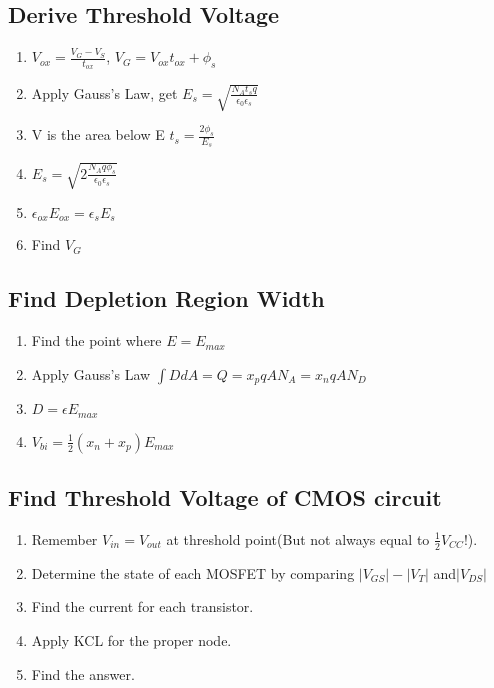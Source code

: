 \documentclass{article}
\begin{document}
   \subsection{Derive Threshold Voltage}
   \begin{enumerate}
     \item $V_{ox} = \frac{V_G - V_{S}}{t_{ox}}$, $V_G = V_{ox}t_{ox} + \phi_s$
     \item Apply Gauss's Law, get $E_s =\sqrt{ \frac{N_At_sq}{\epsilon_0\epsilon_s}}$ 
     \item V is the area below E $t_s = \frac{2\phi_s}{E_s}$
     \item $E_s =\sqrt{ 2\frac{N_Aq\phi_s}{\epsilon_0\epsilon_s}}$ 
     \item $\epsilon_{ox}E_{ox} = \epsilon_{s}E_s$
     \item Find $V_G$
   \end{enumerate}
   
   \subsection{Find Depletion Region Width}
   \begin{enumerate}
     \item Find the point where $E = E_{max}$
     \item Apply Gauss's Law $\int DdA = Q = x_pqAN_A = x_nqAN_D$
     \item $D = \epsilon E_{max}$
     \item $V_{bi} = \frac{1}{2}(x_n + x_p)E_{max}$
   \end{enumerate}

   \subsection{Find Threshold Voltage of CMOS circuit}
   \begin{enumerate}
    \item Remember $V_{in} = V_{out}$ at threshold point(But not always equal to $\frac{1}{2}V_{CC}$!).
    \item Determine the state of each MOSFET by comparing $|V_{GS}| - |V_{T}|$ and$ |V_{DS}|$
    \item Find the current for each transistor.
    \item Apply KCL for the proper node.
    \item Find the answer.
   \end{enumerate}


   
   
   
\end{document}
